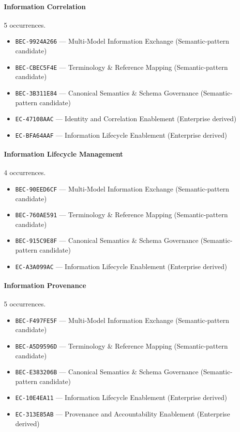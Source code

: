 \documentclass[11pt,a4paper,openany]{book}
\begin{document}
\paragraph{Information Correlation} 5 occurrences.\par
\begin{itemize}
\item \texttt{BEC-9924A266} --- Multi-Model Information Exchange (Semantic-pattern candidate)
\item \texttt{BEC-CBEC5F4E} --- Terminology \& Reference Mapping (Semantic-pattern candidate)
\item \texttt{BEC-3B311E84} --- Canonical Semantics \& Schema Governance (Semantic-pattern candidate)
\item \texttt{EC-47108AAC} --- Identity and Correlation Enablement (Enterprise derived)
\item \texttt{EC-BFA64AAF} --- Information Lifecycle Enablement (Enterprise derived)
\end{itemize}
\paragraph{Information Lifecycle Management} 4 occurrences.\par
\begin{itemize}
\item \texttt{BEC-90EED6CF} --- Multi-Model Information Exchange (Semantic-pattern candidate)
\item \texttt{BEC-760AE591} --- Terminology \& Reference Mapping (Semantic-pattern candidate)
\item \texttt{BEC-915C9E8F} --- Canonical Semantics \& Schema Governance (Semantic-pattern candidate)
\item \texttt{EC-A3A099AC} --- Information Lifecycle Enablement (Enterprise derived)
\end{itemize}
\paragraph{Information Provenance} 5 occurrences.\par
\begin{itemize}
\item \texttt{BEC-F497FE5F} --- Multi-Model Information Exchange (Semantic-pattern candidate)
\item \texttt{BEC-A5D9596D} --- Terminology \& Reference Mapping (Semantic-pattern candidate)
\item \texttt{BEC-E383206B} --- Canonical Semantics \& Schema Governance (Semantic-pattern candidate)
\item \texttt{EC-10E4EA11} --- Information Lifecycle Enablement (Enterprise derived)
\item \texttt{EC-313E85AB} --- Provenance and Accountability Enablement (Enterprise derived)
\end{itemize}
\end{document}
